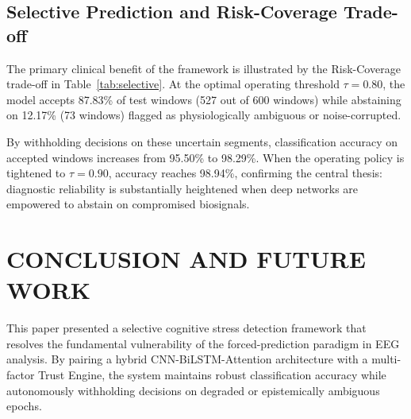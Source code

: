 \documentclass[conference,a4paper]{IEEEtran}
\begin{document}
\subsection{Selective Prediction and Risk-Coverage Trade-off}
The primary clinical benefit of the framework is illustrated by the Risk-Coverage trade-off in Table~\ref{tab:selective}. At the optimal operating threshold $\tau = 0.80$, the model accepts 87.83\% of test windows (527 out of 600 windows) while abstaining on 12.17\% (73 windows) flagged as physiologically ambiguous or noise-corrupted.

By withholding decisions on these uncertain segments, classification accuracy on accepted windows increases from 95.50\% to 98.29\%. When the operating policy is tightened to $\tau = 0.90$, accuracy reaches 98.94\%, confirming the central thesis: diagnostic reliability is substantially heightened when deep networks are empowered to abstain on compromised biosignals.
\begin{table}[htbp]
\renewcommand{\arraystretch}{1.4}
\caption{Risk-Coverage Trade-off Under Selective Prediction}
\label{tab:selective}
\begin{center}
\end{center}
\end{table}

\section{CONCLUSION AND FUTURE WORK}
This paper presented a selective cognitive stress detection framework that resolves the fundamental vulnerability of the forced-prediction paradigm in EEG analysis. By pairing a hybrid CNN-BiLSTM-Attention architecture with a multi-factor Trust Engine, the system maintains robust classification accuracy while autonomously withholding decisions on degraded or epistemically ambiguous epochs.
\end{document}
